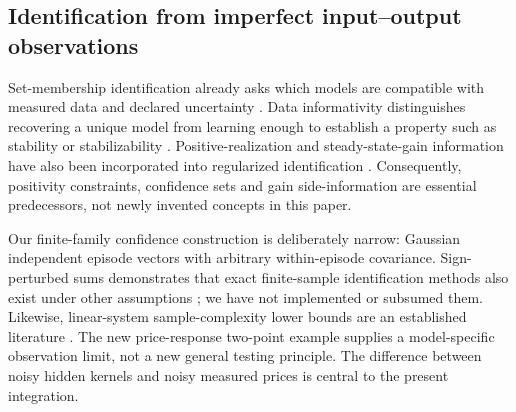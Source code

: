 \documentclass[11pt,a4paper]{article}
\theoremstyle{definition}
\theoremstyle{remark}
\begin{document}
\subsection{Identification from imperfect input--output observations}
Set-membership identification already asks which models are compatible with measured data and declared uncertainty \citep{kosut1992}. Data informativity distinguishes recovering a unique model from learning enough to establish a property such as stability or stabilizability \citep{vanwaarde2020}. Positive-realization and steady-state-gain information have also been incorporated into regularized identification \citep{khosravi2025,khosravi2022}. Consequently, positivity constraints, confidence sets and gain side-information are essential predecessors, not newly invented concepts in this paper.

Our finite-family confidence construction is deliberately narrow: Gaussian independent episode vectors with arbitrary within-episode covariance. Sign-perturbed sums demonstrates that exact finite-sample identification methods also exist under other assumptions \citep{csaji2015}; we have not implemented or subsumed them. Likewise, linear-system sample-complexity lower bounds are an established literature \citep{jedra2019}. The new price-response two-point example supplies a model-specific observation limit, not a new general testing principle. The difference between noisy hidden kernels and noisy measured prices is central to the present integration.
\end{document}
